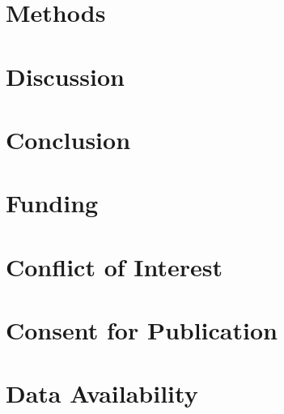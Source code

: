\documentclass[pdflatex,sn-nature]{sn-jnl}%
\begin{document}
\section{Methods}\label{sec11}









\section{Discussion}\label{sec12}




\section{Conclusion}\label{sec13}



\backmatter







\section*{Funding}


\section*{Conflict of Interest}



\section*{Consent for Publication}

\section*{Data Availability}

\end{document}
